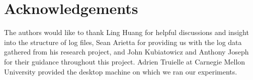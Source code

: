 \documentclass[conference]{style/acmsiggraph}
\begin{document}
\section*{Acknowledgements}
The authors would like to thank Ling Huang for helpful discussions and insight into the structure of log files,
Sean Arietta for providing us with the log data gathered from his research project,
and John Kubiatowicz and Anthony Joseph for their guidance throughout this project.
Adrien Truielle at Carnegie Mellon University provided the desktop machine on which we ran our experiments.




\end{document}

